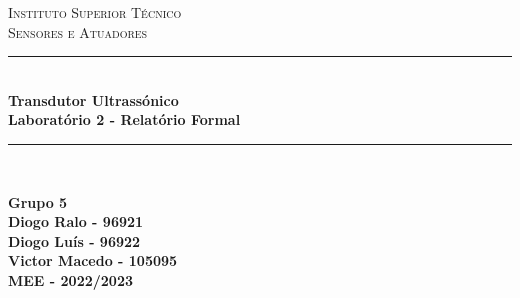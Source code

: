 \begin{titlepage}


\newcommand{\HRule}{\rule{\linewidth}{0.5mm}} %

\center %
 \vspace*{1cm}

\textsc{\LARGE Instituto Superior Técnico}\\[1.5cm] %
\textsc{\Large  Sensores e Atuadores}\\[0.5cm] %


\HRule \\[0.4cm]
{ \LARGE \bfseries Transdutor Ultrassónico}\\[0.4cm] %
{ \large \bfseries Laboratório 2 - Relatório Formal}\\[0.4cm] %
\HRule \\[1.5cm]
 

\begin{center}
\large\textbf{Grupo 5}\\
\large\textbf{Diogo Ralo - 96921}\\ 
\large\textbf{Diogo Luís - 96922}\\ 
\large\textbf{Victor Macedo - 105095}\\ 
\large\textbf{MEE - 2022/2023} 
\end{center}



\begin{minipage}{0.4\textwidth}
\begin{flushright} \large
\end{flushright}
\end{minipage}\\[.5cm]


\end{titlepage}
